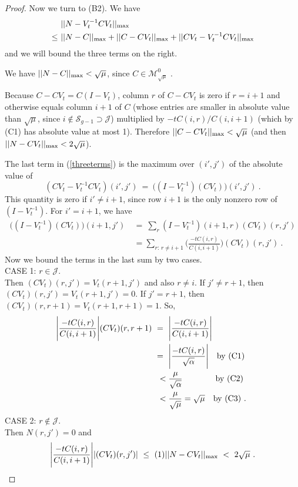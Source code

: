 \documentclass{amsart}
\theoremstyle{definition}
\theoremstyle{remark}
\numberwithin{equation}{section}
\begin{document}
{{\begin{proof}
Now we turn to (B2). We have 
\begin{align} \label{threeterms}
&\ ||N-V_t^{-1}CV_t ||_{\textnormal{max}}  \\ 
\notag 
\leq &\ 
||N-C ||_{\textnormal{max}} + 
||C-CV_t ||_{\textnormal{max}} + 
||CV_t -V_t^{-1}CV_t ||_{\textnormal{max}} 
\end{align}  
and we will bound the three terms on the 
right. 

We have 
$||N-C ||_{\textnormal{max}} < \sqrt{\mu}$,  
since $C\in \mathcal M^0_{\sqrt{\mu}}$ .   

Because 
 $C-CV_t = C(I-V_t)$, 
 column $r$ of $C-CV_t$ is zero if $r=i+1$ 
and otherwise equals column $i+1$ of $C$ (whose entries 
are smaller in absolute value than $\sqrt{\mu}$, since $i\notin 
\mathcal S_{g-1}\supset \mathcal J$) multiplied by 
$-tC(i,r)/C(i,i+1)$ (which by (C1) has absolute value at most 1). Therefore 
$||C-CV_t ||_{\textnormal{max}} <  \sqrt{\mu}$ (and then 
 $||N-CV_t ||_{\textnormal{max}} <  2\sqrt{\mu}$).

The last term in (\ref{threeterms}) is the maximum 
 over $(i',j')$ of the absolute value of 
\[
(CV_t -V_t^{-1}CV_t)(i',j') \ 
= \ 
\Big((I -V_t^{-1})(CV_t)\Big)(i',j') \ . 
\]
This quantity is zero if $i'\neq i+1$, 
since row $i+1$ is the only nonzero row of 
$ (I -V_t^{-1})$. 
For $i'=i+1$, we have 
\begin{align*} 
\Big((I -V_t^{-1})(CV_t)\Big)(i+1,j') 
\ &= \ 
\sum_r
(I -V_t^{-1})(i+1,r)(CV_t)(r,j') \\
& = 
\sum_{ r:\,  r\neq i+1}
\Bigg( \frac{-tC(i,r)}{C(i,i+1)}\Bigg)
(CV_t)(r,j') \ . 
\end{align*}
Now we bound the terms in the last sum by two cases. 
\\
CASE 1: $r\in \mathcal J$. \\
Then $(CV_t)(r,j')=V_t(r+1,j')$  and also $r\neq i$. 
 If $j'\neq r+1$, then 
$(CV_t)(r,j')=V_t(r+1,j')=0$.
If $j'=r+1$, then 
 $(CV_t)(r,r+1)=V_t(r+1,r+1)=
1$. So, 
\begin{align*}
\Bigg| \frac{-tC(i,r)}{C(i,i+1)}\Bigg| 
(CV_t)(r,r+1) 
\ &= \
 \Bigg| \frac{-tC(i,r)}{C(i,i+1)}\Bigg|  \\ 
\ &= \
 \Bigg| \frac{-tC(i,r)}{\sqrt{\alpha}}\Bigg|  
\quad \textnormal{by (C1) }\\
\ &\ <  \frac{\mu}{\sqrt{\alpha}}  
\qquad \qquad  \textnormal{by (C2)} \\
\ &\ <
\frac{\mu}{\sqrt{\mu}} = \sqrt{\mu }
\quad \textnormal{by (C3) . } 
\end{align*} 
CASE 2:  $r\notin \mathcal J$. \\  
Then $N(r,j')=0$ and 
\[
\Bigg| \frac{-tC(i,r)}{C(i,i+1)}\Bigg| 
|(CV_t)(r,j')|  \ 
\leq \ 
(1)||N-CV_t||_{\textnormal{max}} \ < \ 
2\sqrt{\mu} \ . 
\]


\end{proof}}}
\end{document}
